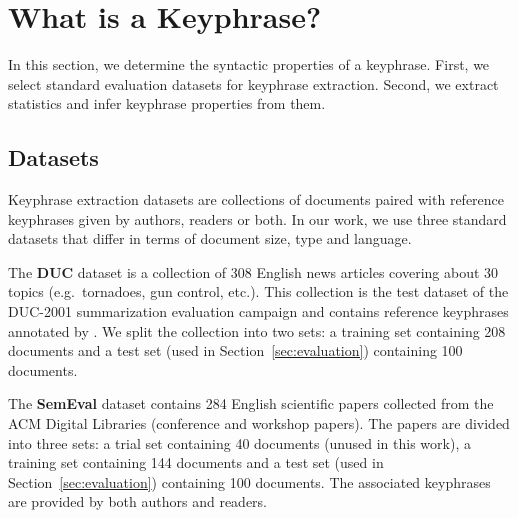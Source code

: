 
\section{What is a Keyphrase?}
\label{sec:definition_of_candidate_keyphrases}
  In this section, we determine the syntactic properties of a keyphrase. First,
  we select standard evaluation datasets for keyphrase extraction. Second, we
  extract statistics and infer keyphrase properties from them.

  \subsection{Datasets}
  \label{subsec:keyphrase_extraction_datasets}
    Keyphrase extraction datasets are collections of documents paired with
    reference keyphrases given by authors, readers or both. In our work, we use
    three standard datasets that differ in terms of document size,  type and
    language.

    The \textbf{DUC} dataset \cite{over2001duc} is a collection of 308 English
    news articles covering about 30 topics (e.g.~tornadoes, gun control, etc.).
    This collection is the test dataset of the DUC-2001 summarization evaluation
    campaign and contains reference keyphrases annotated by
    . We split the collection into two sets: a
    training set containing 208 documents and a test set (used in
    Section~\ref{sec:evaluation}) containing 100 documents.

    The \textbf{SemEval} dataset \cite{kim2010semeval} contains 284 English
    scientific papers collected from the ACM Digital Libraries (conference and
    workshop papers). The papers are divided into three sets: a trial set
    containing 40 documents (unused in this work), a training set containing 144
    documents and a test set (used in Section~\ref{sec:evaluation}) containing
    100 documents. The associated keyphrases are provided by both authors and
    readers.

